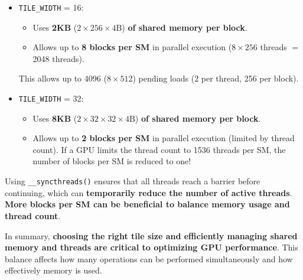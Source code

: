 \begin{itemize}
    \item \texttt{TILE\_WIDTH} = 16:
    \begin{itemize}
        \item Uses \textbf{2KB} ($2 \times 256 \times 4\text{B}$) \textbf{of shared memory per block}.
        \item Allows up to \textbf{8 blocks per SM} in parallel execution ($8 \times 256$ threads $=$ 2048 threads).
    \end{itemize}
    This allows up to 4096 ($8 \times 512$) pending loads (2 per thread, 256 per block).
    
    \item \texttt{TILE\_WIDTH} = 32:
    \begin{itemize}
        \item Uses \textbf{8KB} ($2 \times 32 \times 32 \times 4\text{B}$) \textbf{of shared memory per block}.
        \item Allows up to \textbf{2 blocks per SM} in parallel execution (limited by thread count). If a GPU limits the thread count to 1536 threads per SM, the number of blocks per SM is reduced to one!
    \end{itemize}
\end{itemize}
Using \texttt{\_\_syncthreads()} ensures that all threads reach a barrier before continuing, which can \textbf{temporarily reduce the number of active threads}. \textbf{More blocks per SM can be beneficial to balance memory usage and thread count}.

\highspace
In summary, \textbf{choosing the right tile size and efficiently managing shared memory and threads are critical to optimizing GPU performance}. This balance affects how many operations can be performed simultaneously and how effectively memory is used.
